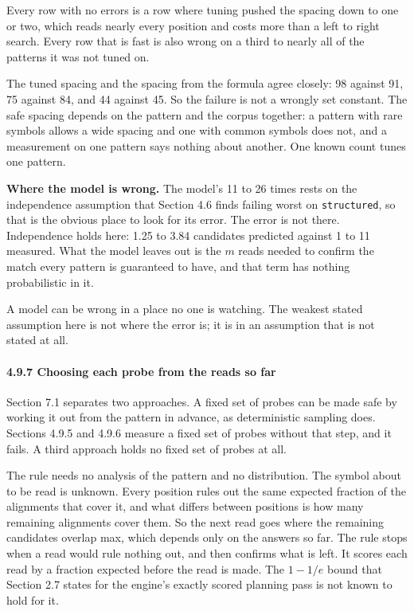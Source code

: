 Every row with no errors is a row where tuning pushed the spacing down to one or two, which reads nearly every position and costs more than a left to right search. Every row that is fast is also wrong on a third to nearly all of the patterns it was not tuned on.

The tuned spacing and the spacing from the formula agree closely: 98 against 91, 75 against 84, and 44 against 45. So the failure is not a wrongly set constant. The safe spacing depends on the pattern and the corpus together: a pattern with rare symbols allows a wide spacing and one with common symbols does not, and a measurement on one pattern says nothing about another. One known count tunes one pattern.

\noindent\textbf{Where the model is wrong.} The model's 11 to 26 times rests on the independence assumption that Section 4.6 finds failing worst on \texttt{structured}, so that is the obvious place to look for its error. The error is not there. Independence holds here: 1.25 to 3.84 candidates predicted against 1 to 11 measured. What the model leaves out is the \(m\) reads needed to confirm the match every pattern is guaranteed to have, and that term has nothing probabilistic in it.

A model can be wrong in a place no one is watching. The weakest stated assumption here is not where the error is; it is in an assumption that is not stated at all.

\paragraph{4.9.7 Choosing each probe from the reads so far}

Section 7.1 separates two approaches. A fixed set of probes can be made safe by working it out from the pattern in advance, as deterministic sampling does. Sections 4.9.5 and 4.9.6 measure a fixed set of probes without that step, and it fails. A third approach holds no fixed set of probes at all.

The rule needs no analysis of the pattern and no distribution. The symbol about to be read is unknown. Every position rules out the same expected fraction of the alignments that cover it, and what differs between positions is how many remaining alignments cover them. So the next read goes where the remaining candidates overlap max, which depends only on the answers so far. The rule stops when a read would rule nothing out, and then confirms what is left. It scores each read by a fraction expected before the read is made. The \(1 - 1/e\) bound that Section 2.7 states for the engine's exactly scored planning pass is not known to hold for it.

